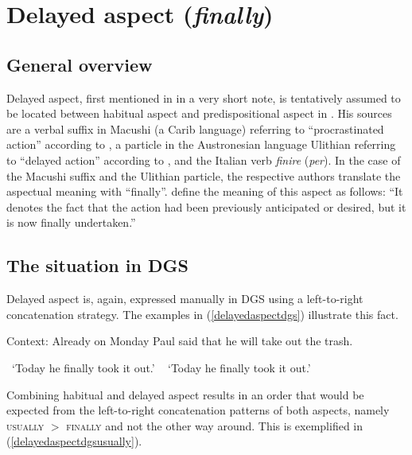 
\section{Delayed aspect (\textit{finally})}
\subsection{General overview}

Delayed aspect, first mentioned in \citet[105]{cinque1999adverbs} in a very short note, is tentatively assumed to be located between habitual aspect and predispositional aspect in \citet[93]{cinque2006restructuring}. His sources are a verbal suffix in Macushi (a Carib language) referring to ``procrastinated action'' according to \citet[119]{macushi}, a particle in the Austronesian language Ulithian referring to ``delayed action'' according to \citet[116]{sohn1980ulithian}, and the Italian verb \textit{finire} (\textit{per}). In the case of the Macushi suffix and the Ulithian particle, the respective authors translate the aspectual meaning with ``finally''. \citet[116]{sohn1980ulithian} define the meaning of this aspect as follows: ``It denotes the fact that the action had been previously anticipated or desired, but it is now finally undertaken.''

\subsection{The situation in DGS}
Delayed aspect is, again, expressed manually in DGS using a left-to-right concatenation strategy. The examples in (\ref{delayedaspectdgs}) illustrate this fact.

\begin{exe}
\ex Context: Already on Monday Paul said that he will take out the trash.\label{delayedaspectdgs}
\begin{xlist} 
\glt \textcolor{white}{*}`Today he finally took it out.' \label{ex:delayedaspectdgsa}
\glt\textcolor{white}{*} `Today he finally took it out.' \label{ex:delayedaspectdgsb}
\end{xlist}
\end{exe}  

\noindent Combining habitual and delayed aspect results in an order that would be expected from the left-to-right concatenation patterns of both aspects, namely \textsc{usually} $>$ \textsc{finally} and not the other way around. This is exemplified in (\ref{delayedaspectdgsusually}).


